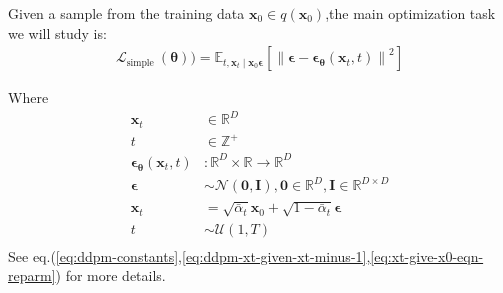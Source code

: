 \documentclass[11pt]{article}
\begin{document}
    Given a sample from the training data $\mathbf{x}_0 \in q(\mathbf{x}_0)$,the main optimization task we will study is:
    \begin{equation}
        \begin{aligned}
            \mathcal{L}_{\text {simple }}(\bm{\theta})) =\mathbb{E}_{t,\mathbf{x}_t \mid \mathbf{x}_0
            \boldsymbol{\epsilon}}\left[\left\|\boldsymbol{\epsilon}-\boldsymbol{\epsilon}_
                {\bm{\theta}}\left(\mathbf{x}_t, t\right)\right\|^2\right]
        \end{aligned}
        \label{eq:ddpm-loss-simple-repeated}
    \end{equation}

    Where
    \begin{align*}
        \mathbf{x}_t &\in \mathbb{R}^D \\
        t &\in \mathbb{Z}^{+}\\
        \boldsymbol{\epsilon}_{\bm{\theta}}\left(\mathbf{x}_t, t\right) &: \mathbb{R}^{D} \times \mathbb{R} \rightarrow \mathbb{R}^{D}\\
        \bm{\epsilon} &\sim \mathcal{N}(\mathbf{0},\mathbf{I}),\mathbf{0} \in \mathbb{R}^D, \mathbf{I} \in \mathbb{ R}^{D \times D} \\
        \mathbf{x}_t &=\sqrt{\bar{\alpha}_t} \mathbf{x}_0+\sqrt{1-\bar{\alpha}_t} \boldsymbol{\epsilon}\\
        t &\sim \mathcal{U}(1,T)\\
    \end{align*}
    See eq.(\ref{eq:ddpm-constants},\ref{eq:ddpm-xt-given-xt-minus-1},\ref{eq:xt-give-x0-eqn-reparm}) for more details.
\end{document}
